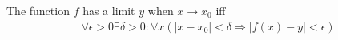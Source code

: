 The function $f$ has a limit $y$ when $x \rightarrow x_0$ iff
\begin{align}
  \forall\epsilon > 0 \exists\delta > 0 : \forall x (|x - x_0| < \delta \Rightarrow |f(x) - y| <
  \epsilon)
\end{align}
